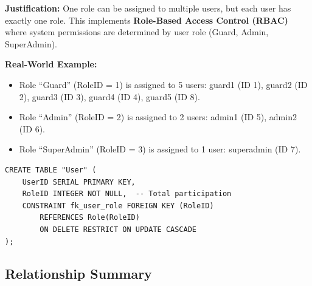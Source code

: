 \documentclass[a4paper, 12pt]{article}
\begin{document}
\textbf{Justification:} One role can be assigned to multiple users, but each user has exactly one role. This implements \textbf{Role-Based Access Control (RBAC)} where system permissions are determined by user role (Guard, Admin, SuperAdmin).

\textbf{Real-World Example:}
\begin{itemize}[leftmargin=*, nosep]
    \item Role ``Guard'' (RoleID = 1) is assigned to 5 users: guard1 (ID 1), guard2 (ID 2), guard3 (ID 3), guard4 (ID 4), guard5 (ID 8).
    \item Role ``Admin'' (RoleID = 2) is assigned to 2 users: admin1 (ID 5), admin2 (ID 6).
    \item Role ``SuperAdmin'' (RoleID = 3) is assigned to 1 user: superadmin (ID 7).
\end{itemize}

\begin{lstlisting}[style=sqlstyle, caption={R12 Implementation}, label={lst:r12}]
CREATE TABLE "User" (
    UserID SERIAL PRIMARY KEY,
    RoleID INTEGER NOT NULL,  -- Total participation
    CONSTRAINT fk_user_role FOREIGN KEY (RoleID)
        REFERENCES Role(RoleID)
        ON DELETE RESTRICT ON UPDATE CASCADE
);
\end{lstlisting}

\subsection{Relationship Summary}
\end{document}
